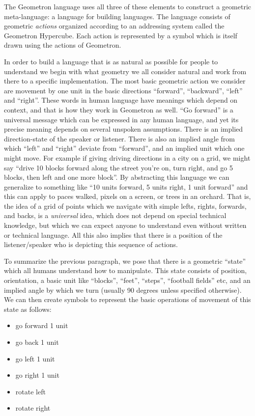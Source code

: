 The Geometron language uses all three of these elements to construct a
geometric meta-language: a language for building languages. The language
consists of geometric \emph{actions} organized according to an
addressing system called the Geometron Hypercube. Each action is
represented by a symbol which is itself drawn using the actions of
Geometron.

In order to build a language that is as natural as possible for people
to understand we begin with what geometry we all consider natural and
work from there to a specific implementation. The most basic geometric
action we consider are movement by one unit in the basic directions
``forward'', ``backward'', ``left'' and ``right''. These words in human
language have meanings which depend on context, and that is how they
work in Geometron as well. ``Go forward'' is a universal message which
can be expressed in any human language, and yet its precise meaning
depends on several unspoken assumptions. There is an implied
direction-state of the speaker or listener. There is also an implied
angle from which ``left'' and ``right'' deviate from ``forward'', and an
implied unit which one might move. For example if giving driving
directions in a city on a grid, we might say ``drive 10 blocks forward
along the street you're on, turn right, and go 5 blocks, then left and
one more block''. By abstracting this language we can generalize to
something like ``10 units forward, 5 units right, 1 unit forward'' and
this can apply to paces walked, pixels on a screen, or trees in an
orchard. That is, the idea of a grid of points which we navigate with
simple lefts, rights, forwards, and backs, is a \emph{universal} idea,
which does not depend on special technical knowledge, but which we can
expect anyone to understand even without written or technical language.
All this also implies that there is a position of the listener/speaker
who is depicting this sequence of actions.

To summarize the previous paragraph, we pose that there is a geometric
``state'' which all humans understand how to manipulate. This state
consists of position, orientation, a basic unit like ``blocks'',
``feet'', ``steps'', ``football fields'' etc, and an implied angle by
which we turn (usually 90 degrees unless specified otherwise). We can
then create symbols to represent the basic operations of movement of
this state as follows:

\begin{itemize}
\tightlist
\item
  go forward 1 unit
\item
  go back 1 unit
\item
  go left 1 unit
\item
  go right 1 unit
\item
  rotate left
\item
  rotate right
\end{itemize}

